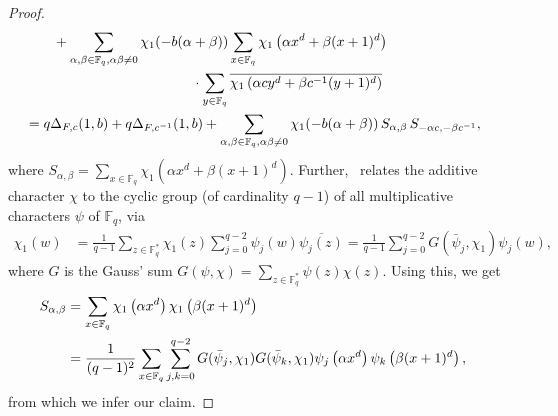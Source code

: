 \documentclass[11pt]{article}
\def\F{{\mathbb F}}
\def\\{\cr}
\begin{document}
\begin{proof}
\begin{align*}
&\qquad +\sum_{\alpha,\beta\in\F_q,\alpha\beta\neq 0} \chi_1(-b(\alpha+\beta))
\sum_{x\in \F_q}
\chi_1\left(\alpha x^d+\beta(x+1)^d\right)\\
&\qquad\qquad\qquad\qquad\qquad\qquad\cdot  \sum_{y\in \F_q} \overline{ \chi_1\left(\alpha cy^d+ \beta c^{-1} (y+1)^d  \right)}\\
&=q\Delta_{F,c}(1,b)+q\Delta_{F,c^{-1}}(1,b) +\sum_{\alpha,\beta\in\F_q,\alpha\beta\neq 0} \chi_1(-b(\alpha+\beta))\, S_{\alpha,\beta}\, S_{-\alpha c,-\beta c^{-1}},
\end{align*}
where $S_{\alpha,\beta} =\sum_{x\in \F_q} \chi_1\left(\alpha x^d+\beta(x+1)^d\right)$.
Further,~\cite[Equation (5.17)]{LN97} relates the additive character $\chi$ to the cyclic group (of cardinality $q-1$) of all multiplicative characters $\psi$ of $\F_q$, via
\begin{align*}
\chi_1(w)&=\frac{1}{q-1} \sum_{z\in\F_q^*} \chi_1(z)\sum_{j=0}^{q-2} \psi_j(w) \overline{\psi_j(z)}
=\frac{1}{q-1} \sum_{j=0}^{q-2} G(\bar\psi_j,\chi_1) \psi_j(w),
\end{align*}
where $G$ is the Gauss' sum $\displaystyle G(\psi,\chi)=\sum_{z\in\F_q^*} \psi(z)\chi(z)$.
Using this, we get
\allowdisplaybreaks
\begin{align*}
S_{\alpha,\beta}&=\sum_{x\in \F_q} \chi_1\left(\alpha x^d\right)\chi_1\left(\beta(x+1)^d\right)\\
&=\frac{1}{(q-1)^2}  \sum_{x\in \F_q} \sum_{j,k=0}^{q-2} G(\bar\psi_j,\chi_1) G(\bar\psi_k,\chi_1)\psi_j\left(\alpha x^d\right)  \psi_k\left(\beta(x+1)^d\right),
\end{align*}
from which we infer our claim.
\end{proof}
\end{document}
